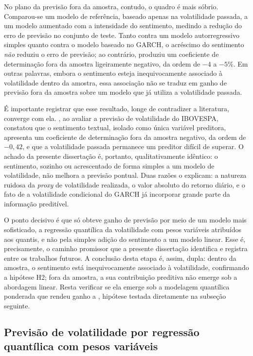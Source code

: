 No plano da previsão fora da amostra, contudo, o quadro é mais sóbrio. Comparou-se um modelo de referência, baseado apenas na volatilidade passada, a um modelo aumentado com a intensidade do sentimento, medindo a redução do erro de previsão no conjunto de teste. Tanto contra um modelo autorregressivo simples quanto contra o modelo baseado no GARCH, o acréscimo do sentimento \emph{não} reduziu o erro de previsão; ao contrário, produziu um coeficiente de determinação fora da amostra ligeiramente negativo, da ordem de $-4$ a $-5\%$. Em outras palavras, embora o sentimento esteja inequivocamente associado à volatilidade dentro da amostra, essa associação não se traduz em ganho de previsão fora da amostra sobre um modelo que já utiliza a volatilidade passada.

É importante registrar que esse resultado, longe de contradizer a literatura, converge com ela. , ao avaliar a previsão de volatilidade do IBOVESPA, constatou que o sentimento textual, isolado como única variável preditora, apresenta um coeficiente de determinação fora da amostra negativo, da ordem de $-0{,}42$, e que a volatilidade passada permanece um preditor difícil de superar. O achado da presente dissertação é, portanto, qualitativamente idêntico: o sentimento, sozinho ou acrescentado de forma simples a um modelo de volatilidade, não melhora a previsão pontual. Duas razões o explicam: a natureza ruidosa da \textit{proxy} de volatilidade realizada, o valor absoluto do retorno diário, e o fato de a volatilidade condicional do GARCH já incorporar grande parte da informação preditível.

O ponto decisivo é que  só obteve ganho de previsão por meio de um modelo mais sofisticado, a regressão quantílica da volatilidade com pesos variáveis atribuídos aos quantis, e não pela simples adição do sentimento a um modelo linear. Esse é, precisamente, o caminho promissor que a presente dissertação identifica e registra entre os trabalhos futuros. A conclusão desta etapa é, assim, dupla: dentro da amostra, o sentimento está inequivocamente associado à volatilidade, confirmando a hipótese H2; fora da amostra, a sua contribuição preditiva não emerge sob a abordagem linear. Resta verificar se ela emerge sob a modelagem quantílica ponderada que rendeu ganho a , hipótese testada diretamente na subseção seguinte.

\subsection{Previsão de volatilidade por regressão quantílica com pesos variáveis}

